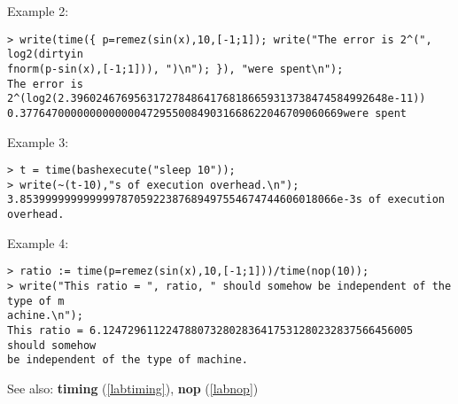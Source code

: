 \noindent Example 2: 
\begin{center}\begin{minipage}{15cm}\begin{Verbatim}[frame=single]
> write(time({ p=remez(sin(x),10,[-1;1]); write("The error is 2^(", log2(dirtyin
fnorm(p-sin(x),[-1;1])), ")\n"); }), "were spent\n");
The error is 2^(log2(2.39602467695631727848641768186659313738474584992648e-11))
0.377647000000000000047295500849031668622046709060669were spent
\end{Verbatim}
\end{minipage}\end{center}
\noindent Example 3: 
\begin{center}\begin{minipage}{15cm}\begin{Verbatim}[frame=single]
> t = time(bashexecute("sleep 10"));
> write(~(t-10),"s of execution overhead.\n");
3.85399999999999978705922387689497554674744606018066e-3s of execution overhead.
\end{Verbatim}
\end{minipage}\end{center}
\noindent Example 4: 
\begin{center}\begin{minipage}{15cm}\begin{Verbatim}[frame=single]
> ratio := time(p=remez(sin(x),10,[-1;1]))/time(nop(10));
> write("This ratio = ", ratio, " should somehow be independent of the type of m
achine.\n");
This ratio = 6.1247296112247880732802836417531280232837566456005 should somehow 
be independent of the type of machine.
\end{Verbatim}
\end{minipage}\end{center}
See also: \textbf{timing} (\ref{labtiming}), \textbf{nop} (\ref{labnop})
